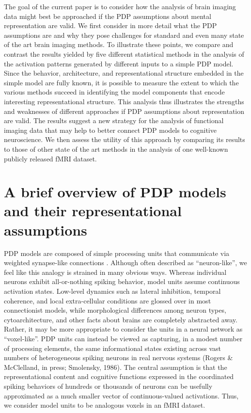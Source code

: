 The goal of the current paper is to consider how the analysis of brain imaging data might best be approached if the PDP assumptions about mental representation are valid. We first consider in more detail what the PDP assumptions are and why they pose challenges for standard and even many state of the art brain imaging methods. To illustrate these points, we compare and contrast the results yielded by five different statistical methods in the analysis of the activation patterns generated by different inputs to a simple PDP model.  Since the behavior, architecture, and representational structure embedded in the simple model are fully known, it is possible to measure the extent to which the various methods succeed in identifying the model components that encode interesting representational structure. This analysis thus illustrates the strengths and weaknesses of different approaches if PDP assumptions about representation are valid. The results suggest a new strategy for the analysis of functional imaging data that may help to better connect PDP models to cognitive neuroscience. We then assess the utility of this approach by comparing its results to those of other state of the art methods in the analysis of one well-known publicly released fMRI dataset.


\section{A brief overview of PDP models and their representational assumptions}
PDP models are composed of simple processing units that communicate via weighted synapse-like connections \cite{McClellandRumelhart86,RogersMcClellandPDP25}. %
Although often described as ``neuron-like'', we feel like this analogy is strained in many obvious ways. Whereas individual neurons exhibit all-or-nothing spiking behavior, model units assume continuous activation states. Low-level dynamics such as lateral inhibition, temporal coherence, and local extra-cellular conditions are glossed over in most connectionist models, while morphological differences among neuron types, cytoarchitecture, and other facts about brains are completely abstracted away. Rather, it may be more appropriate to consider the units in a neural network as ``voxel-like''.  PDP units can instead be viewed as capturing, in a modest number of processing elements, the same informational states existing across vast numbers of heterogeneous spiking neurons in real nervous systems (Rogers \& McClelland, in press; Smolensky, 1986). The central assumption is that the representational content and cognitive functions expressed in the coordinated spiking behaviors of hundreds or thousands of neurons can be usefully approximated as a much smaller vector of continuous-valued activations. Thus, we consider model units to be analogous voxels in an fMRI dataset.

